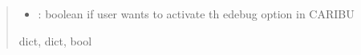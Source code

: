 \documentclass[letterpaper,10pt,english]{sphinxmanual}
\begin{document}
\begin{fulllineitems}
\begin{quote}
\begin{description}
\begin{itemize}
\begin{description}
\end{description}

\item {} 
\sphinxAtStartPar
{}: boolean if user wants to activate th edebug option in CARIBU

\end{itemize}


\sphinxAtStartPar
dict, dict, bool

\end{description}\end{quote}

\end{fulllineitems}

\end{document}
